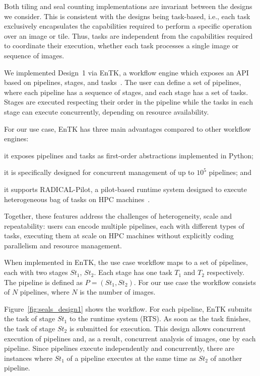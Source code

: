 Both tiling and seal counting implementations are invariant between the
designs we consider. This is consistent with the designs being task-based,
i.e., each task exclusively encapsulates the capabilities required to perform
a specific operation over an image or tile. Thus, tasks are independent
from the capabilities required to coordinate their execution, whether each
task processes a single image or sequence of images.

We implemented Design~1 via EnTK, a workflow engine which exposes an API
based on pipelines, stages, and tasks~\cite{balasubramanian2018harnessing}.
The user can define a set of pipelines, where each pipeline has a sequence of
stages, and each stage has a set of tasks. Stages are executed respecting
their order in the pipeline while the tasks in each stage can execute
concurrently, depending on resource availability.

For our use case, EnTK has three main advantages compared to other
workflow engines:
\begin{inparaenum}[(1)]
	\item it exposes pipelines and tasks as first-order abstractions
	implemented in Python;
	\item it is specifically designed for concurrent management of up to
	$10^5$ pipelines; and
	\item it supports RADICAL-Pilot, a pilot-based runtime system designed to
	execute heterogeneous bag of tasks on HPC
	machines~\cite{merzky2018using}.
\end{inparaenum} 
Together, these features address the challenges of heterogeneity, scale and
repeatability: users can encode multiple pipelines, each with different types
of tasks, executing them at scale on HPC machines without explicitly coding
parallelism and resource management.

When implemented in EnTK, the use case workflow maps to a set of pipelines,
each with two stages $St_{1}$, $St_{2}$. Each stage has one task
$T_{1}$ and $T_{2}$ respectively. The pipeline is defined as 
$P = (St_{1},St_{2})$. For our use case the workflow consists of $N$ 
pipelines, where $N$ is the number of images.


Figure~\ref{fig:seals_design1} shows the workflow. For each pipeline, EnTK
submits the task of stage $St_{1}$ to the runtime system (RTS). As soon as
the task finishes, the task of stage $St_{2}$ is submitted for execution.
This design allows concurrent execution of pipelines and, as a result, 
concurrent analysis of images, one by each pipeline. Since pipelines
execute independently and concurrently, there are instances where $St_{1}$
of a pipeline executes at the same time as $St_{2}$ of another pipeline.


